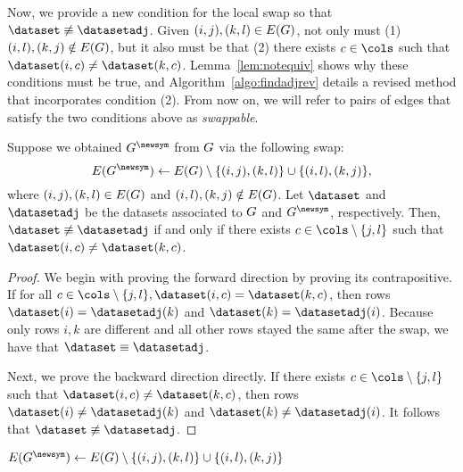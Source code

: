 Now, we provide a new condition for the local swap so that $\dataset \not\equiv
\datasetadj$. Given $(i, j), (k, l) \in E(G)$, not only must (1) $(i,
l), (k, j) \notin E(G)$, but it also must be that (2) there exists $c
\in \cols$ such that $\dataset(i, c) \neq \dataset(k, c)$.
Lemma~\ref{lem:notequiv} shows why these conditions must be true, and
Algorithm~\ref{algo:findadjrev} details a revised \findadj{} method that
incorporates condition (2). From now on, we will refer to pairs of edges that
satisfy the two conditions above as \textit{swappable}.

\begin{lemma}\label{lem:notequiv}
  Suppose we obtained $\graphadj$ from $G$ via the following swap:
  \[
    \edges(\graphadj) \leftarrow \edges(\graph) \setminus \{(i, j), (k, l)\}
    \cup \{(i, l), (k, j)\},
  \]
  where $(i, j), (k, l) \in E(G)$ and $(i, l), (k, j) \notin
  E(G)$. Let $\dataset$ and $\datasetadj$ be the datasets associated
  to $G$ and $\graphadj$, respectively. Then, $\dataset \not\equiv
  \datasetadj$ if and only if there exists $c \in \cols \setminus \{j, l \}$
  such that $\dataset(i, c) \neq \dataset(k, c)$.
\end{lemma}

\begin{proof}
  We begin with proving the forward direction by proving its contrapositive. If
  for all $c \in \cols \setminus \{j, l\}, \dataset(i, c) = \dataset(k, c)$,
  then rows $\dataset(i) = \datasetadj(k)$ and $\dataset(k) = \datasetadj(i)$.
  Because only rows $i, k$ are different and all other rows stayed the same
  after the swap, we have that $\dataset \equiv \datasetadj$.

  Next, we prove the backward direction directly. If there exists $c \in \cols
  \setminus \{j, l\}$ such that $\dataset(i, c) \neq \dataset(k, c)$, then rows
  $\dataset(i) \neq \datasetadj(k)$ and $\dataset(k) \neq \datasetadj(i)$.
  It follows that $\dataset \not\equiv \datasetadj$.
\end{proof}

\begin{algorithm}
	\caption{\findadjrev}\label{algo:findadjrev}
	\DontPrintSemicolon{}

	$\edges(\graphadj) \leftarrow \edges(\graph) \setminus \{(i, j), (k, l)\}
	\cup \{(i, l), (k, j)\}$\;
	\Return{$\graphadj$}
\end{algorithm}

